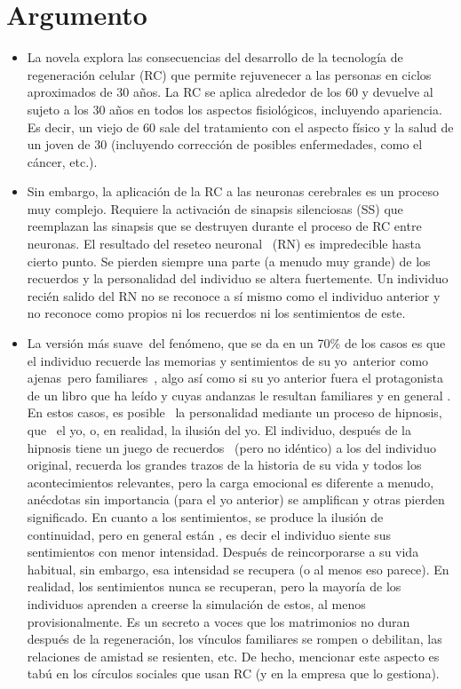 \section*{Argumento}
\begin{itemize}
\item La novela explora las consecuencias del desarrollo de la tecnología de regeneración celular (RC) que permite rejuvenecer a las personas en ciclos aproximados de 30 años. La RC se aplica alrededor de los 60 y devuelve al sujeto a los 30 años en todos los aspectos fisiológicos, incluyendo apariencia. Es decir, un viejo de 60 sale del tratamiento con el aspecto físico y la salud de un joven de 30 (incluyendo corrección de posibles enfermedades, como el cáncer, etc.). 
\item Sin embargo, la aplicación de la RC a las neuronas cerebrales es un proceso muy complejo. Requiere la activación de sinapsis silenciosas (SS) que reemplazan las sinapsis que se destruyen durante el proceso de RC entre neuronas. El resultado del \gl reseteo neuronal\gr~ (RN) es impredecible hasta cierto punto. Se pierden siempre una parte (a menudo muy grande) de los recuerdos y la personalidad del individuo se altera fuertemente. Un individuo recién salido del RN no se reconoce a sí mismo como el individuo anterior y no reconoce como propios ni los recuerdos ni los sentimientos de este. 
\item La versión más \gl suave\gr~del fenómeno, que se da en un 70\% de los casos es que el individuo recuerde las memorias y sentimientos de su \gl yo\gr~anterior como \gl ajenas\gr~pero \gl familiares\gr~, algo así como si su yo anterior fuera el protagonista de un libro que ha leído y cuyas andanzas le resultan familiares y en general . En estos casos, es posible ~la personalidad mediante un proceso de hipnosis, que ~el yo, o, en realidad, la ilusión del yo. El individuo, después de la hipnosis tiene un juego de recuerdos ~(pero no idéntico) a los del individuo original, recuerda los grandes trazos de la historia de su vida y todos los acontecimientos relevantes, pero la carga emocional es diferente a menudo, anécdotas sin importancia (para el yo anterior) se amplifican y otras pierden significado. En cuanto a los sentimientos, se produce la ilusión de continuidad, pero en general están , es decir el individuo siente sus sentimientos con menor intensidad. Después de reincorporarse a su vida habitual, sin embargo, esa intensidad se recupera (o al menos eso parece). En realidad, los sentimientos nunca se recuperan, pero la mayoría de los individuos aprenden a creerse la simulación de estos, al menos provisionalmente. Es un secreto a voces que los matrimonios no duran después de la regeneración, los vínculos familiares se rompen o debilitan, las relaciones de amistad se resienten, etc. De hecho, mencionar este aspecto es tabú en los círculos sociales que usan RC (y en la empresa que lo gestiona). 

\end{itemize}
